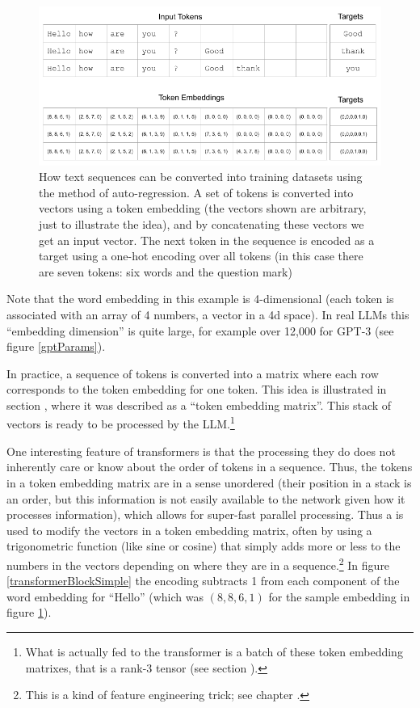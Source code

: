 \begin{figure}[h]
\centering
\includegraphics[scale=.45]{./images/contextWindow.png}
\caption[Jeff Yoshimi]{How text sequences can be converted into training datasets using the method of auto-regression. A set of tokens is converted into vectors using a token embedding (the vectors shown are arbitrary, just to illustrate the idea), and by concatenating these vectors we get an input vector. The next token in the sequence is encoded as a target using a one-hot encoding over all tokens (in this case there are seven tokens: six words and the question mark)}
\label{nextWordPrediction}
\end{figure}

Note that the word embedding in this example is 4-dimensional (each token is associated with an array of 4 numbers, a vector in a 4d space). In real LLMs this ``embedding dimension'' is quite large, for example over 12,000 for GPT-3 (see figure \ref{gptParams}). 

In practice, a sequence of tokens is converted into a matrix where each row corresponds to the token embedding for one token. This idea is illustrated in section , where it was described as a ``token embedding matrix''. This stack of vectors is ready to be processed by the LLM.\footnote{What is actually fed to the transformer is  a batch of these token embedding matrixes, that is a rank-3 tensor (see section ).}

One interesting feature of transformers is that the processing they do does not inherently care or know about the order of tokens in a sequence. Thus, the tokens in a token embedding matrix are in a sense unordered (their position in a stack is an order, but this information is not easily available to the network given how it processes information), which allows for super-fast parallel processing. Thus a  is used to modify the vectors in a token embedding matrix, often by using a trigonometric function (like sine or cosine) that simply adds more or less to the numbers in the vectors depending on where they are in a sequence.\footnote{This is a kind of feature engineering trick; see chapter .}  In figure \ref{transformerBlockSimple} the encoding subtracts 1 from each component of the word embedding for ``Hello'' (which was $(8,8,6,1)$ for the sample embedding in figure \ref{nextWordPrediction}).
  
